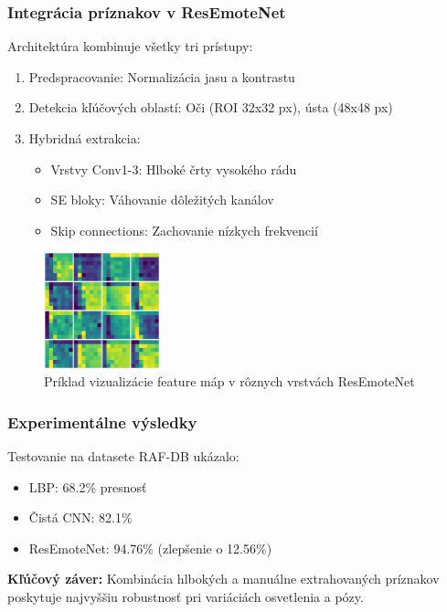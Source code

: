 \subsubsection{Integrácia príznakov v ResEmoteNet}
Architektúra kombinuje všetky tri prístupy:
\begin{enumerate}
    \item Predspracovanie: Normalizácia jasu a kontrastu
    \item Detekcia kľúčových oblastí: Oči (ROI 32x32 px), ústa (48x48 px)
    \item Hybridná extrakcia:
    \begin{itemize}
        \item Vrstvy Conv1-3: Hlboké črty vysokého rádu
        \item SE bloky: Váhovanie dôležitých kanálov
        \item Skip connections: Zachovanie nízkych frekvencií
    \end{itemize}
\end{enumerate}

\begin{figure}[htpb!]
\centering
\includegraphics[width=0.3\textwidth]{img/feature_maps.png}
\caption{Príklad vizualizácie feature máp v rôznych vrstvách ResEmoteNet}
\label{fig:feature_maps}
\end{figure}
\newpage
\subsubsection{Experimentálne výsledky}
Testovanie na datasete RAF-DB ukázalo:
\begin{itemize}
    \item LBP: 68.2\% presnosť
    \item Čistá CNN: 82.1\% 
    \item ResEmoteNet: 94.76\% (zlepšenie o 12.56\%)
\end{itemize}

\textbf{Kľúčový záver:} Kombinácia hlbokých a manuálne extrahovaných príznakov poskytuje najvyššiu robustnosť pri variáciách osvetlenia a pózy.

